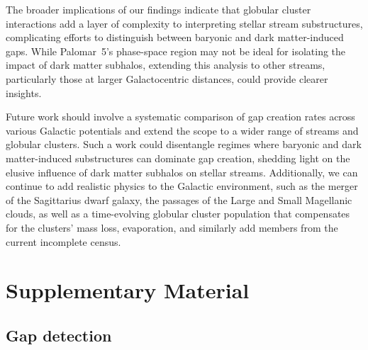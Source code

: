    The broader implications of our findings indicate that globular cluster interactions add a layer of complexity to interpreting stellar stream substructures, complicating efforts to distinguish between baryonic and dark matter-induced gaps. While Palomar~5's phase-space region may not be ideal for isolating the impact of dark matter subhalos, extending this analysis to other streams, particularly those at larger Galactocentric distances, could provide clearer insights. 

    Future work should involve a systematic comparison of gap creation rates across various Galactic potentials and extend the scope to a wider range of streams and globular clusters. Such a work could disentangle regimes where baryonic and dark matter-induced substructures can dominate gap creation, shedding light on the elusive influence of dark matter subhalos on stellar streams. Additionally, we can continue to add realistic physics to the Galactic environment, such as the merger of the Sagittarius dwarf galaxy, the passages of the Large and Small Magellanic clouds, as well as a time-evolving globular cluster population that compensates for the clusters' mass loss, evaporation, and similarly add members from the current incomplete census.

\section{Supplementary Material}

    \subsection{Gap detection} \label{sec:gap_detection}

